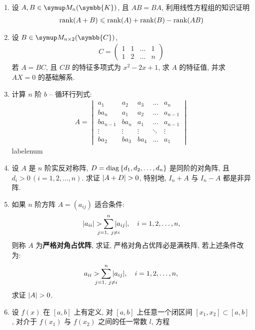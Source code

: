 \documentclass{ctexart}
\makeatletter
\let\le\leqslant
\def\asteriskitem{*}
\def\sitem{%
  \expandafter\let\expandafter\originallabel\csname labelenum\romannumeral\@enumdepth\endcsname
  \expandafter\def\csname labelenum\romannumeral\@enumdepth\expandafter\endcsname\expandafter{%
    \expandafter\bfseries\expandafter\color{red}\expandafter{\expandafter\asteriskitem\expandafter\originallabel}}%
  \item
  \expandafter\let\csname labelenum\romannumeral\@enumdepth\endcsname\originallabel
}
\newcommand{\K}{\ensuremath{\symbb{K}}}
\newcommand{\C}{\ensuremath{\symbb{C}}}
\DeclareMathOperator{\diag}{diag}
\makeatother
\begin{document}
\begin{enumerate}[series=exer]
\begin{enumerate}
    \end{enumerate}
    \item 设 $ A, B \in \MM[\K] $, 且 $ AB = BA $, 利用线性方程组的知识证明
    \begin{align*}
        \rank(A + B) \le \rank(A) + \rank(B) - \rank(AB)
    \end{align*}
    \item 设 $ B \in \MM[\C][n \times 2] $, 
    \begin{align*}
        C = \begin{pmatrix}
            1 & 1 & \dots & 1\\
            1 & 2 & \dots & n
        \end{pmatrix}
    \end{align*}
    若 $ A = BC $, 且 $ CB $ 的特征多项式为 $ x^{2} - 2x + 1 $, 求 $ A $ 的特征值, 并求 $ AX = 0 $ 的基础解系. 
    \item  计算 $ n $ 阶 $ b $ -- 循环行列式:
    \begin{align*}
        A = \begin{vmatrix}
            a_{1}   & a_{2} & a_{3} & \ldots    & a_{n} \\
            ba_{n}  & a_{1} & a_{2} & \ldots    & a_{n-1} \\
            ba_{n-1}    & ba_{n}    & a_{1} & \ldots & a_{n-1} \\
            \vdots  & \vdots & \vdots & \ddots & \vdots \\
            ba_{2} & ba_{3} & ba_{4} & \ldots & a_{1}
        \end{vmatrix}
    \end{align*}
    \sitem\label{item:反称加对角} 设 $ A $ 是 $ n $ 阶实反对称阵, $ D = \diag\qty{d_{1}, d_{2}, \dots, d_{n}} $ 是同阶的对角阵, 且 $ d_{i} > 0\,(i = 1, 2, \dots, n) $. 求证 $ \abs{A + D} > 0 $, 特别地, $ I_{n} + A $ 与 $ I_{n} - A $ 都是非异阵. 
    \item 如果 $ n $ 阶方阵 $ A = (a_{ij}) $ 适合条件:
    \begin{align*}
        \abs{a_{ii}} > \sum_{\mathclap{j = 1,\ j \ne i}}^{n} \abs{a_{ij}}, \quad i = 1, 2, \dots, n,
    \end{align*}
    则称 $ A $ 为\textbf{严格对角占优阵}, 求证, 严格对角占优阵必是满秩阵, 若上述条件改为:
    \begin{align*}
        a_{ii} > \sum_{\mathclap{j = 1,\ j \ne i}}^{n} \abs{a_{ij}}, \quad i = 1, 2, \dots, n,
    \end{align*}   
    求证 $ \abs{A} > 0 $. 
    \item 设 $ f(x) $ 在 $ [a, b] $ 上有定义, 对 $ [a, b] $ 上任意一个闭区间 $ [x_{1}, x_{2}] \subset [a, b] $, 对介于 $ f(x_{1}) $ 与 $ f(x_{2}) $ 之间的任一常数 $ l $, 方程 

\end{enumerate}
\end{document}
